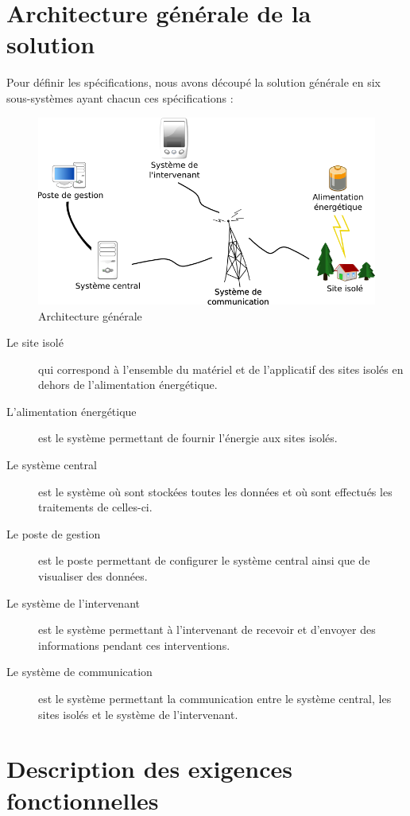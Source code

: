 \documentclass[a4paper, 11pt]{article}
\begin{document}
\section{Architecture générale de la solution}
Pour définir les spécifications, nous avons découpé la solution générale en six sous-systèmes ayant chacun ces spécifications :

\begin{figure}[!htp]
\begin{center}
\includegraphics[width=.7\textwidth]{schema_architecture_generale.png}
\caption{Architecture générale}
\label{figure:schema_architecture_generale}
\end{center}
\end{figure}

\begin{description}
	\item[Le site isolé] qui correspond à l'ensemble du matériel et de l'applicatif des sites isolés en dehors de l'alimentation énergétique.
	\item[L'alimentation énergétique] est le système permettant de fournir l'énergie aux sites isolés.
	\item[Le système central] est le système où sont stockées toutes les données et où sont effectués les traitements de celles-ci.
	\item[Le poste de gestion] est le poste permettant de configurer le système central ainsi que de visualiser des données.
	\item[Le système de l'intervenant] est le système permettant à l'intervenant de recevoir et d'envoyer des informations pendant ces interventions.
	\item[Le système de communication] est le système permettant la communication entre le système central, les sites isolés et le système de l'intervenant.
\end{description}

\section{Description des exigences fonctionnelles}
\end{document}
